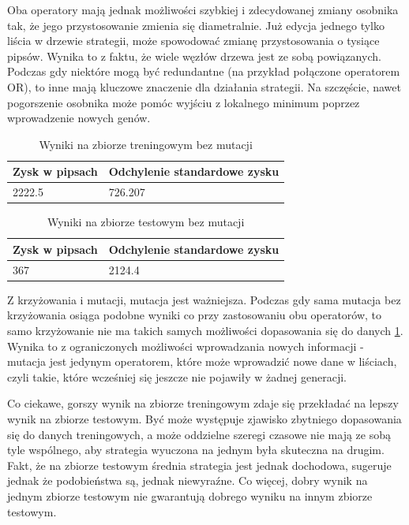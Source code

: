 \documentclass[twoside]{iisthesis}
\begin{document}
Oba operatory mają jednak możliwości szybkiej i zdecydowanej zmiany osobnika tak, że jego przystosowanie zmienia się diametralnie. Już edycja jednego tylko liścia w drzewie strategii, może spowodować zmianę przystosowania o tysiące pipsów. Wynika to z faktu, że wiele węzłów drzewa jest ze sobą powiązanych. Podczas gdy niektóre mogą być redundantne (na przykład połączone operatorem OR), to inne mają kluczowe znaczenie dla działania strategii. Na szczęście, nawet pogorszenie osobnika może pomóc wyjściu z lokalnego minimum poprzez wprowadzenie nowych genów.

\begin{table}[h]
\center
\caption{Wyniki na zbiorze treningowym bez mutacji}
\label{wynikiBezMutacji}
\begin{tabular}{|l|l|}
  \hline
  Zysk w pipsach & Odchylenie standardowe zysku\\
  \hline
2222.5 & 726.207 \\
  \hline
\end{tabular} 
\end{table}

\begin{table}[h]
\center
\caption{Wyniki na zbiorze testowym bez mutacji}
\label{wynikiBezMutacjiTest}
\begin{tabular}{|l|l|}
  \hline
  Zysk w pipsach & Odchylenie standardowe zysku\\
  \hline
367 & 2124.4 \\
  \hline
\end{tabular} 
\end{table}

Z krzyżowania i mutacji, mutacja jest ważniejsza. Podczas gdy sama mutacja bez krzyżowania osiąga podobne wyniki co przy zastosowaniu obu operatorów, to samo krzyżowanie nie ma takich samych możliwości dopasowania się do danych \ref{wynikiBezMutacji}. Wynika to z ograniczonych możliwości wprowadzania nowych informacji - mutacja jest jedynym operatorem, które może wprowadzić nowe dane w liściach, czyli takie, które wcześniej się jeszcze nie pojawiły w żadnej generacji.

Co ciekawe, gorszy wynik na zbiorze treningowym zdaje się przekładać na lepszy wynik na zbiorze testowym. Być może występuje zjawisko zbytniego dopasowania się do danych treningowych, a może oddzielne szeregi czasowe nie mają ze sobą tyle wspólnego, aby strategia wyuczona na jednym była skuteczna na drugim. Fakt, że na zbiorze testowym średnia strategia jest jednak dochodowa, sugeruje jednak że podobieństwa są, jednak niewyraźne. Co więcej, dobry wynik na jednym zbiorze testowym nie gwarantują dobrego wyniku na innym zbiorze testowym.
 
\end{document}
